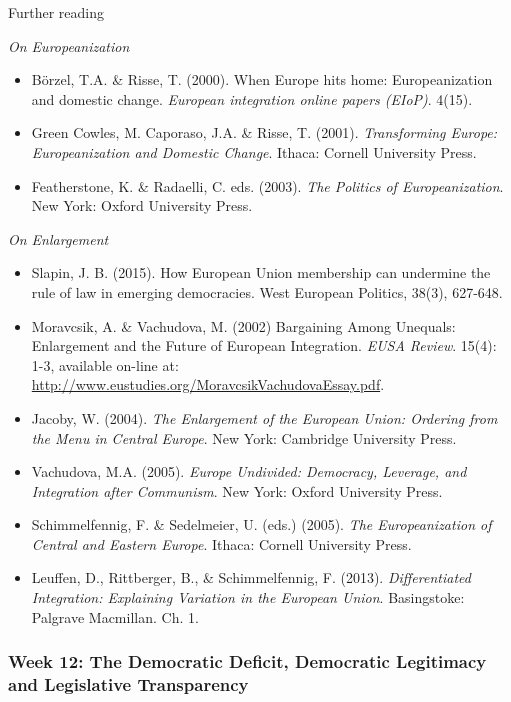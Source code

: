\noindent Further reading

\textit{On Europeanization}

\begin{itemize}
	\item B\"{o}rzel, T.A. \& Risse, T. (2000). When Europe hits home: Europeanization and domestic change. \textit{European integration online papers (EIoP)}. 4(15).
	\item Green Cowles, M. Caporaso, J.A. \& Risse, T. (2001). \textit{Transforming Europe: Europeanization and Domestic Change}. Ithaca: Cornell University Press.
	\item Featherstone, K. \& Radaelli, C. eds. (2003). \textit{The Politics of Europeanization}. New York: Oxford University Press.
\end{itemize}

\textit{On Enlargement}

\begin{itemize}
	\item Slapin, J. B. (2015). How European Union membership can undermine the rule of law in emerging democracies. West European Politics, 38(3), 627-648.
	\item Moravcsik, A. \& Vachudova, M. (2002) Bargaining Among Unequals: Enlargement and the Future of European Integration. \textit{EUSA Review}. 15(4): 1-3, available on-line at:
	\url{http://www.eustudies.org/MoravcsikVachudovaEssay.pdf}.
	\item Jacoby, W. (2004). \textit{The Enlargement of the European Union: Ordering from the Menu in Central Europe}. New York: Cambridge University Press.
	\item Vachudova, M.A. (2005). \textit{Europe Undivided: Democracy, Leverage, and Integration after Communism}. New York: Oxford University Press.
	\item Schimmelfennig, F. \& Sedelmeier, U. (eds.) (2005). \textit{The Europeanization of Central and Eastern Europe}. Ithaca: Cornell University Press.
	\item Leuffen, D., Rittberger, B., \& Schimmelfennig, F. (2013). \textit{Differentiated Integration: Explaining Variation in the European Union}. Basingstoke: Palgrave Macmillan. Ch. 1.	
\end{itemize}

\subsubsection*{Week 12: The Democratic Deficit, Democratic Legitimacy and Legislative Transparency}  


